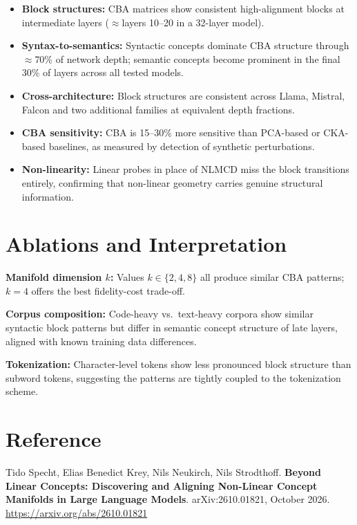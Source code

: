 \documentclass[10pt,twocolumn]{article}
\begin{document}
\begin{itemize}[itemsep=2pt,parsep=0pt]
  \item \textbf{Block structures:} CBA matrices show consistent high-alignment blocks
    at intermediate layers ($\approx$layers 10--20 in a 32-layer model).
  \item \textbf{Syntax-to-semantics:} Syntactic concepts dominate CBA structure
    through $\approx$70\% of network depth; semantic concepts become prominent
    in the final 30\% of layers across all tested models.
  \item \textbf{Cross-architecture:} Block structures are consistent across Llama,
    Mistral, Falcon and two additional families at equivalent depth fractions.
  \item \textbf{CBA sensitivity:} CBA is 15--30\% more sensitive than PCA-based
    or CKA-based baselines, as measured by detection of synthetic perturbations.
  \item \textbf{Non-linearity:} Linear probes in place of NLMCD miss the block
    transitions entirely, confirming that non-linear geometry carries genuine
    structural information.
\end{itemize}

\section{Ablations and Interpretation}

\textbf{Manifold dimension $k$:} Values $k \in \{2,4,8\}$ all produce similar CBA
patterns; $k=4$ offers the best fidelity-cost trade-off.

\textbf{Corpus composition:} Code-heavy vs.\ text-heavy corpora show similar
syntactic block patterns but differ in semantic concept structure of late layers,
aligned with known training data differences.

\textbf{Tokenization:} Character-level tokens show less pronounced block structure
than subword tokens, suggesting the patterns are tightly coupled to the tokenization
scheme.

\section*{Reference}

Tido Specht, Elias Benedict Krey, Nils Neukirch, Nils Strodthoff.
\textbf{Beyond Linear Concepts: Discovering and Aligning Non-Linear Concept Manifolds
in Large Language Models}.
arXiv:2610.01821, October 2026.\\
\url{https://arxiv.org/abs/2610.01821}
\end{document}

